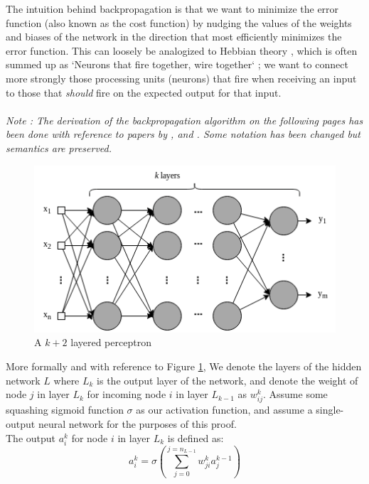 \documentclass[12pt]{article}
\begin{document}
The intuition behind backpropagation is that we want to minimize the error function (also known as the cost function) by nudging the values of the weights and biases of the network in the direction that most efficiently minimizes the error function. 
This can loosely be analogized to Hebbian theory \autocite{10.1007/978-3-642-70911-1_15}, which is often summed up as `Neurons that fire together, wire together` \autocite{doi:10.1126/science.1372754}; we want to connect more strongly those processing units (neurons) that fire when receiving an input to those that \textit{should} fire on the expected output for that input. 
\\\newline 
\\\newline \textit{Note : The derivation of the backpropagation algorithm on the following pages has been done with reference to papers by \textcite{118638}, \textcite{rumelhart1995backpropagation} and \textcite{rumelhart1986learning}. Some notation has been changed but semantics are preserved.}
\begin{figure}[H]
    \centering
    \includegraphics[scale=0.9 ]{5.png}
    \caption{A $k+2$ layered perceptron}
    \label{backprop}
\end{figure}
More formally and with reference to Figure \ref{backprop}, We denote the layers of the hidden network $L$ where $L_k$ is the output layer of the network, and denote the weight of node $j$ in layer $L_k$ for incoming node $i$ in layer $L_{k-1}$ as $w_{ij}^k$. Assume some squashing sigmoid function $\sigma$ as our activation function, and assume a single-output neural network for the purposes of this proof. \\\newline
The output $a_i^k$ for node $i$ in layer $L_k$ is defined as:
\begin{equation}
    a_i^k = \sigma(\sum\limits_{j=0}^{j=n_{L-1}}w_{ji}^ka^{k-1}_j)
\end{equation}
\end{document}
